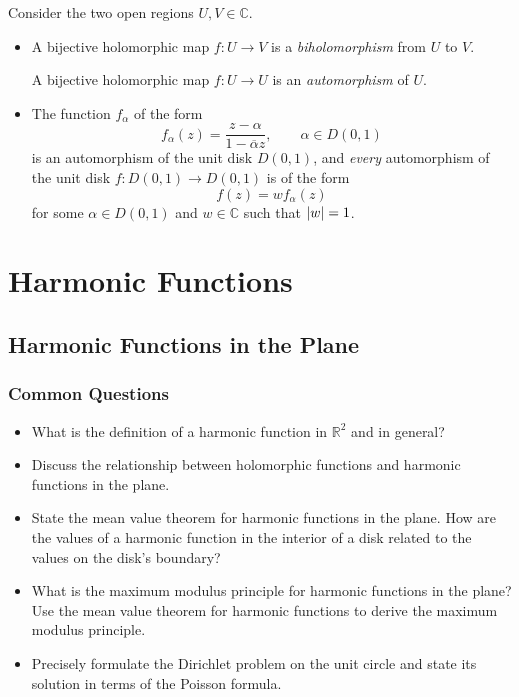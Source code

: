\documentclass[11pt, a4paper]{article}
\newcommand{\R}{\mathbb{R}} %
\newcommand{\C}{\mathbb{C}} %
\begin{document}
Consider the two open regions $ U, V \in \C $.
\begin{itemize}
	\item A bijective holomorphic map $ f : U \to V $ is a \textit{biholomorphism} from $ U $ to $ V $.
	
	A bijective holomorphic map $ f: U \to U $ is an \textit{automorphism} of $ U $.
	
	\item The function $ f_{\alpha} $ of the form
		\begin{equation*}
			f_{\alpha}(z) = \frac{z - \alpha}{1 - \overline{\alpha}z}, \qquad \alpha \in D(0, 1)
		\end{equation*}
		is an automorphism of the unit disk $ D(0, 1) $, and \textit{every} automorphism of the unit disk $ f: D(0, 1) \to D(0, 1) $ is of the form 
		\begin{equation*}
			f(z) = w f_{\alpha}(z)
		\end{equation*}
		for some $ \alpha \in D(0, 1) $ and $ w \in \C $ such that $ \abs{w} = 1 $.
\end{itemize}


\section{Harmonic Functions}

\subsection{Harmonic Functions in the Plane}
\subsubsection{Common Questions}
\begin{itemize}
	\item What is the definition of a harmonic function in $ \R^{2} $ and in general?
	
	\item Discuss the relationship between holomorphic functions and harmonic functions in the plane.
	
	\item State the mean value theorem for harmonic functions in the plane. How are the values of a harmonic function in the interior of a disk related to the values on the disk's boundary?
	
	\item What is the maximum modulus principle for harmonic functions in the plane? Use the mean value theorem for harmonic functions to derive the maximum modulus principle.
	
	
	\item Precisely formulate the Dirichlet problem on the unit circle and state its solution in terms of the Poisson formula.
\end{itemize}
\end{document}
